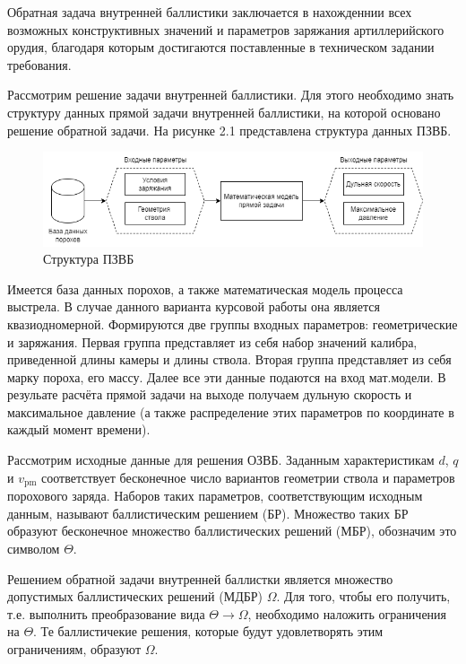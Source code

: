 \documentclass[14pt, a4paper]{extreport} %
\begin{document}
Обратная задача внутренней баллистики заключается в нахожденнии всех возможных конструктивных значений и параметров заряжания артиллерийского орудия, благодаря которым достигаются 
поставленные в техническом задании требования. 

Рассмотрим решение задачи внутренней баллистики. Для этого необходимо знать структуру данных прямой задачи внутренней баллистики, на которой основано решение обратной задачи.
На рисунке 2.1 представлена структура данных ПЗВБ.

\begin{figure}[h]
\centering
\includegraphics[width=0.7\textheight]{imgs/PZVB_sctruct.png}
\caption{Структура ПЗВБ}
\end{figure}

Имеется база данных порохов, а также математическая модель процесса выстрела. В случае данного варианта курсовой работы она является квазиодномерной. Формируются две группы входных параметров: геометрические и заряжания.
Первая группа представляет из себя набор значений калибра, приведенной длины камеры и длины ствола. Вторая группа представляет из себя марку пороха, его массу. Далее все эти данные подаются на вход мат.модели. В резульате расчёта прямой задачи 
на выходе получаем дульную скорость и максимальное давление (а также распределение этих параметров по координате в каждый момент времени).

Рассмотрим исходные данные для решения ОЗВБ. Заданным характеристикам $d$, $q$ и $v_{\text{pm}}$ соответствует бесконечное число вариантов геометрии ствола и параметров порохового заряда. Наборов таких параметров, соответствующим исходным данным, называют баллистическим решением (БР). Множество таких БР образуют бесконечное множество баллистических решений (МБР), обозначим это символом $\Theta$.

Решением обратной задачи внутренней баллистки является множество допустимых баллистических решений (МДБР) $\Omega$. Для того, чтобы его получить, т.е. выполнить преобразование вида $\Theta \longrightarrow \Omega $, необходимо наложить ограничения на $\Theta $. Те баллистичекие решения, которые будут удовлетворять этим ограничениям, образуют $\Omega $.
\end{document}
